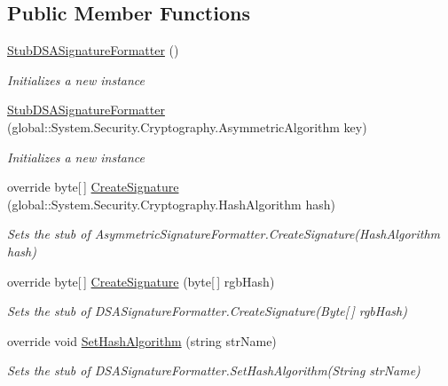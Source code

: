 \subsection*{Public Member Functions}
\begin{DoxyCompactItemize}
\item 
\hyperlink{class_system_1_1_security_1_1_cryptography_1_1_fakes_1_1_stub_d_s_a_signature_formatter_a8ee1def62915c7ada0c82ddcf01ad776}{Stub\-D\-S\-A\-Signature\-Formatter} ()
\begin{DoxyCompactList}\small\item\em Initializes a new instance\end{DoxyCompactList}\item 
\hyperlink{class_system_1_1_security_1_1_cryptography_1_1_fakes_1_1_stub_d_s_a_signature_formatter_aea39cbdc862a7e04f968ed728f84761a}{Stub\-D\-S\-A\-Signature\-Formatter} (global\-::\-System.\-Security.\-Cryptography.\-Asymmetric\-Algorithm key)
\begin{DoxyCompactList}\small\item\em Initializes a new instance\end{DoxyCompactList}\item 
override byte\mbox{[}$\,$\mbox{]} \hyperlink{class_system_1_1_security_1_1_cryptography_1_1_fakes_1_1_stub_d_s_a_signature_formatter_aab612ee20a01d5a4b9f3410ce08fbdbd}{Create\-Signature} (global\-::\-System.\-Security.\-Cryptography.\-Hash\-Algorithm hash)
\begin{DoxyCompactList}\small\item\em Sets the stub of Asymmetric\-Signature\-Formatter.\-Create\-Signature(\-Hash\-Algorithm hash)\end{DoxyCompactList}\item 
override byte\mbox{[}$\,$\mbox{]} \hyperlink{class_system_1_1_security_1_1_cryptography_1_1_fakes_1_1_stub_d_s_a_signature_formatter_a87328d6e63b74c23d5ffb4437588c220}{Create\-Signature} (byte\mbox{[}$\,$\mbox{]} rgb\-Hash)
\begin{DoxyCompactList}\small\item\em Sets the stub of D\-S\-A\-Signature\-Formatter.\-Create\-Signature(\-Byte\mbox{[}$\,$\mbox{]} rgb\-Hash)\end{DoxyCompactList}\item 
override void \hyperlink{class_system_1_1_security_1_1_cryptography_1_1_fakes_1_1_stub_d_s_a_signature_formatter_a1a7d51f73031b1c281564f1d128cebc5}{Set\-Hash\-Algorithm} (string str\-Name)
\begin{DoxyCompactList}\small\item\em Sets the stub of D\-S\-A\-Signature\-Formatter.\-Set\-Hash\-Algorithm(\-String str\-Name)\end{DoxyCompactList}\item 

\end{DoxyCompactItemize}
